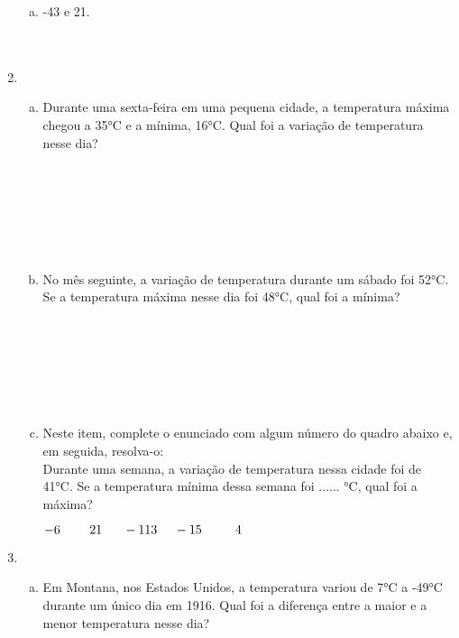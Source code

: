 \documentclass[a4paper,14pt]{article}
\begin{document}
\begin{multicols}{2}
\begin{enumerate}
\begin{enumerate}[a)]
    				\item -43 e 21. \\\\\\
    			\end{enumerate}
    			\item 
    			\begin{enumerate}[a)]
    				\item Durante uma sexta-feira em uma pequena cidade, a temperatura máxima chegou a 35°C e a mínima, 16°C. Qual foi a variação de temperatura nesse dia? \\\\\\\\\\\\\\
    				\item No mês seguinte, a variação de temperatura durante um sábado foi 52°C. Se a temperatura máxima nesse dia foi 48°C, qual foi a mínima? \\\\\\\\\\\\\\
    				\item Neste item, complete o enunciado com algum número do quadro abaixo e, em seguida, resolva-o: \\
    				Durante uma semana, a variação de temperatura nessa cidade foi de 41°C. Se a temperatura mínima dessa semana foi ...... °C, qual foi a máxima?
    				\begin{center} \begin{tcolorbox}[colback=white, colframe=black, boxrule=0.5mm, width=5cm]
    						$-6 ~~~~~~~ 21 ~~~~~ -1 \\\\
    						13 ~~~~ -15 ~~~~~~~~ 4$
    					\end{tcolorbox} \newpage
    				\end{center}
        		\end{enumerate}
        		\item 
        		\begin{enumerate}[a)]
        			\item Em Montana, nos Estados Unidos, a temperatura variou de 7°C a -49°C durante um único dia em 1916. Qual foi a diferença entre a maior e a menor temperatura nesse dia? \\\\\\\\\\\\\\

\end{enumerate}
\end{enumerate}
\end{multicols}
\end{document}

